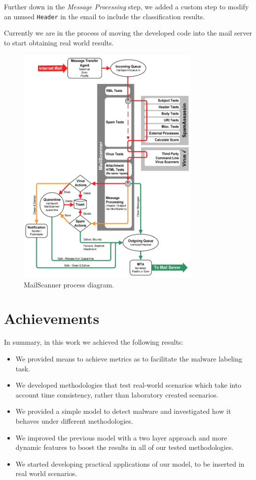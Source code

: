 Further down in the \textit{Message Processing} step, we added a custom step to modify an unused \texttt{Header} in the email to include the classification results.

Currently we are in the process of moving the developed code into the mail server to start obtaining real world results.

\begin{figure}[!h]
	\centering
	\includegraphics[width=0.8\textwidth]{Figures/mailscanner.png}
	\caption{MailScanner process diagram.}
	\label{fig:mailscanner}
\end{figure}


\section{Achievements}
\label{section:achievements}

In summary, in this work we achieved the following results:

\begin{itemize}
	\item We provided means to achieve metrics as to facilitate the malware labeling task.
	\item We developed methodologies that test real-world scenarios which take into account time consistency, rather than laboratory created scenarios.
	\item We provided a simple model to detect malware and investigated how it behaves under different methodologies.
	\item We improved the previous model with a two layer approach and more dynamic features to boost the results in all of our tested methodologies.
	\item We started developing practical applications of our model, to be inserted in real world scenarios.
\end{itemize}

